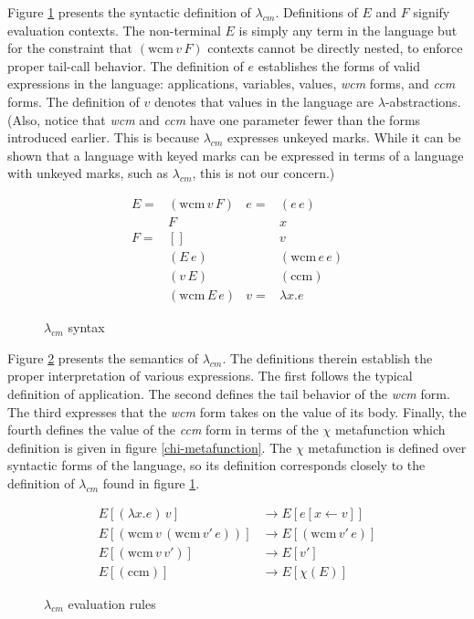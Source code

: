 \documentclass[ms,electronic,twosidetoc,letterpaper,chaptercenter,parttop]{byumsphd}
\begin{document}
Figure \ref{language-syntax} presents the syntactic definition of $\lambda_{cm}$.
Definitions of $E$ and $F$ signify evaluation contexts. The non-terminal $E$ is simply any
term in the language but for the constraint that $(\mathrm{wcm}\,v\,F)$ contexts cannot be
directly nested, to enforce proper tail-call behavior. The definition of $e$ establishes the forms of valid expressions in the
language: applications, variables, values, \emph{wcm} forms, and \emph{ccm} forms. The
definition of $v$ denotes that values in the language are $\lambda$-abstractions. (Also,
notice that \emph{wcm} and \emph{ccm} have one parameter fewer than the forms introduced
earlier. This is because $\lambda_{cm}$ expresses unkeyed marks. While it can be shown
that a language with keyed marks can be expressed in terms of a language with unkeyed
marks, such as $\lambda_{cm}$, this is not our concern.)

\begin{figure}
\begin{align*}
E = &(\mathrm{wcm}\,v\,F) & e = &(e\,e)\\
    &F                    &     &x\\
F = &[]                   &     &v\\
    &(E\,e)               &     &(\mathrm{wcm}\,e\,e)\\
    &(v\,E)               &     &(\mathrm{ccm})\\
    &(\mathrm{wcm}\,E\,e) & v = & \lambda x. e
\end{align*}
\caption{$\lambda_{cm}$ syntax}
\label{language-syntax}
\end{figure}

Figure \ref{language-semantics} presents the semantics of $\lambda_{cm}$. The definitions
therein establish the proper interpretation of various expressions. The first follows the
typical definition of application. The second defines the tail behavior of the \emph{wcm}
form. The third expresses that the \emph{wcm} form takes on the value of its body.
Finally, the fourth defines the value of the \emph{ccm} form in terms of the $\chi$
metafunction which definition is given in figure \ref{chi-metafunction}. The $\chi$
metafunction is defined over syntactic forms of the language, so its definition
corresponds closely to the definition of $\lambda_{cm}$ found in figure
\ref{language-syntax}.

\begin{figure}
\begin{align*}
E[(\lambda x.e)\,v]                         &\rightarrow E[e[x\leftarrow v]]\\
E[(\mathrm{wcm}\,v\,(\mathrm{wcm}\,v'\,e))] &\rightarrow E[(\mathrm{wcm}\,v'\,e)]\\
E[(\mathrm{wcm}\,v\,v')]                    &\rightarrow E[v']\\
E[(\mathrm{ccm})]                           &\rightarrow E[\chi(E)]
\end{align*}
\caption{$\lambda_{cm}$ evaluation rules}
\label{language-semantics}
\end{figure}
\end{document}
